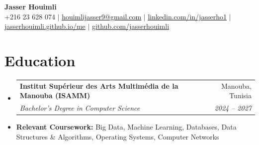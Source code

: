 \documentclass[letterpaper,11pt]{article}
\makeatletter
\newcommand{\resumeSubheading}[4]{
  \vspace{-2pt}\item
    \begin{tabular*}{0.97\textwidth}[t]{l@{\extracolsep{\fill}}r}
      \textbf{#1} & #2 \\
      \textit{\small#3} & \textit{\small #4} \\
    \end{tabular*}\vspace{-7pt}
}
\newcommand{\resumeSubHeadingListStart}{\begin{itemize}[leftmargin=0.15in, label={}]}
\newcommand{\resumeSubHeadingListEnd}{\end{itemize}}
\makeatother
\begin{document}
\begin{center}
    \textbf{\Huge Jasser Houimli} \\ \vspace{1pt}
    \small +216 23 628 074 $|$ \href{mailto:houimlijasser9@gmail.com}{\underline{houimlijasser9@gmail.com}} $|$
    \href{https://www.linkedin.com/in/jasserho1/}{\underline{linkedin.com/in/jasserho1}} $|$
    \href{https://jasserhouimli.github.io/me/}{\underline{jasserhouimli.github.io/me}} $|$
    \href{https://github.com/jasserhouimli}{\underline{github.com/jasserhouimli}}
\end{center}


\section{Education}
  \resumeSubHeadingListStart
    \resumeSubheading
      {Institut Sup{\'e}rieur des Arts Multim{\'e}dia de la Manouba (ISAMM)}{Manouba, Tunisia}
      {Bachelor's Degree in Computer Science}{2024 -- 2027}
    \item\small{\textbf{Relevant Coursework:} Big Data, Machine Learning, Databases, Data Structures \& Algorithms, Operating Systems, Computer Networks}
  \resumeSubHeadingListEnd


\end{document}
